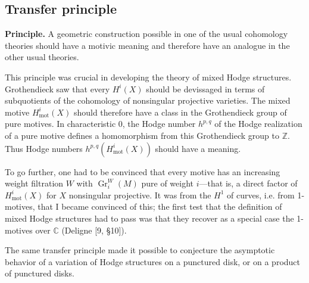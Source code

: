 \documentclass[11pt,a4paper]{article}
\theoremstyle{plain}
\theoremstyle{definition}
\DeclareMathOperator{\Gr}{Gr}
\newcommand{\Z}{\mathbb{Z}}
\newcommand{\C}{\mathbb{C}}
\DeclareMathOperator{\mot}{mot}
\begin{document}
\subsection{Transfer principle}

\textbf{Principle.} A geometric construction possible in one of the usual cohomology theories should have a motivic meaning and therefore have an analogue in the other usual theories.

This principle was crucial in developing the theory of mixed Hodge structures. Grothendieck saw that every $H^i(X)$ should be devissaged in terms of subquotients of the cohomology of nonsingular projective varieties. The mixed motive $H^i_{\mot}(X)$ should therefore have a class in the Grothendieck group of pure motives. In characteristic $0$, the Hodge number $h^{p,q}$ of the Hodge realization of a pure motive defines a homomorphism from this Grothendieck group to $\Z$. Thus Hodge numbers $h^{p,q}(H^i_{\mot}(X))$ should have a meaning.

To go further, one had to be convinced that every motive has an increasing weight filtration $W$ with $\Gr_i^W(M)$ pure of weight $i$---that is, a direct factor of $H^i_{\mot}(X)$ for $X$ nonsingular projective. It was from the $H^1$ of curves, i.e. from 1-motives, that I became convinced of this; the first test that the definition of mixed Hodge structures had to pass was that they recover as a special case the 1-motives over $\C$ (Deligne [9, \S10]).

The same transfer principle made it possible to conjecture the asymptotic behavior of a variation of Hodge structures on a punctured disk, or on a product of punctured disks.
\end{document}
